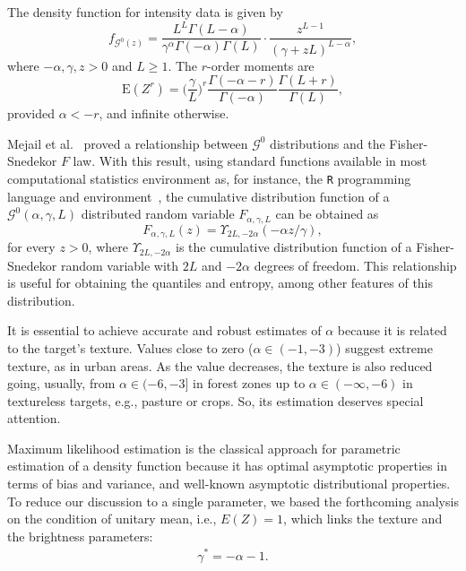 \documentclass[twocolumn]{svjour3}
\begin{document}
	The density function for intensity data is given by
	\begin{equation}
	f_{\mathcal{G}^{0}(z)} =\frac{L^{L}\Gamma ( L-\alpha
		) }{\gamma ^{\alpha }\Gamma ( -\alpha ) \Gamma (
		L) }\cdot  
	\frac{z^{L-1}}{( \gamma +zL) ^{L-\alpha }},%
	\label{ec_dens_gI0}
	\end{equation}
	where $-\alpha,\gamma ,z>0$ and $L\geq 1$. 
	The $r$-order moments are
	\begin{equation}
	\text{E}(Z^r) =\Big(\frac{\gamma}{L}\Big)^r\frac{\Gamma ( -\alpha-r )}{ \Gamma (-\alpha) }
	\frac{\Gamma (L+r )}{\Gamma (L)},
	\label{moments_gI0}
	\end{equation}
	provided $\alpha<-r$, and infinite otherwise.
	
	Mejail et al.~\cite{MejailJacoboFreryBustos:IJRS} proved a relationship between $\mathcal G^0$ distributions and the Fisher-Snedekor $F$ law.
	With this result, using standard functions available in most computational statistics environment as, for instance, the \texttt R programming language and environment~\cite{RLanguage}, the cumulative distribution function of a $\mathcal G^0(\alpha,\gamma,L)$ distributed random variable $F_{\alpha,\gamma,L}$ can be obtained as
	\begin{equation}
	F_{\alpha,\gamma,L}(z) = \Upsilon_{2L, -2\alpha}(-\alpha  z / \gamma),
	\label{eq:CDFG0}
	\end{equation}
	for every $z>0$, where $\Upsilon_{2L, -2\alpha}$ is the cumulative distribution function of a Fisher-Snedekor random variable with $2L$ and $-2\alpha$ degrees of freedom.
	This relationship is useful for obtaining the quantiles and entropy, among other features of this distribution.
	
	It is essential to achieve accurate and robust estimates of $\alpha$ because it is related to the target's texture. 
	Values close to zero ($\alpha \in (-1,-3)$) suggest extreme texture, as in urban areas. 
	As the value decreases, the texture is also reduced going, usually, from $\alpha \in (-6,-3]$ in forest zones up to $\alpha\in(-\infty,-6)$ in textureless targets, e.g., pasture or crops. So, its estimation deserves special attention.
	
	Maximum likelihood estimation is the classical approach for parametric estimation of a density function because it has optimal asymptotic properties in terms of bias and variance, and well-known asymptotic distributional properties.
	To reduce our discussion to a single parameter, we based the forthcoming analysis on the condition of unitary mean, i.e., $E(Z)=1$, which links the texture and the brightness parameters:
	\begin{align}
	\label{RelationAlphaGamma}
	\gamma^* =-\alpha-1.
	\end{align}
	
\end{document}
